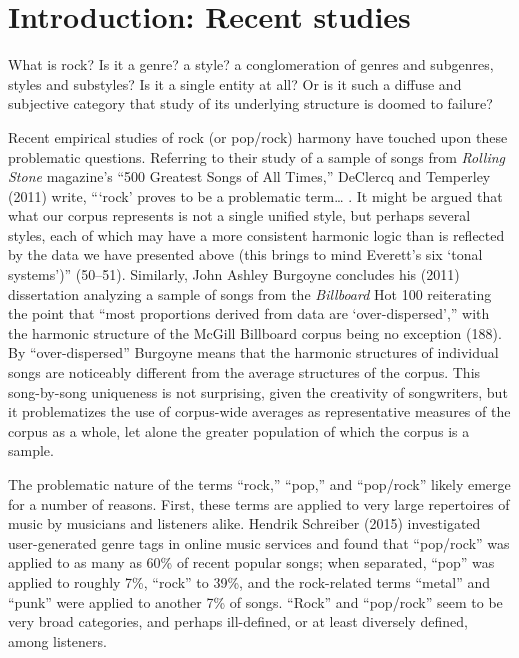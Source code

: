 
\def\mytitle{A cluster analysis of harmony in the McGill Billboard data set}
\def\subtitle{}
\def\myauthor{Kris P. Shaffer, et al.}
\def\latexmode{memoir}


\chapter{Introduction: Recent studies}
\label{introduction:recentstudies}

What is rock? Is it a genre? a style? a conglomeration of genres and subgenres, styles and substyles? Is it a single entity at all? Or is it such a diffuse and subjective category that study of its underlying structure is doomed to failure?

Recent empirical studies of rock (or pop\slash rock) harmony have touched upon these problematic questions. Referring to their study of a sample of songs from \emph{Rolling Stone} magazine's ``500 Greatest Songs of All Times,'' DeClercq and Temperley (2011) write, ```rock' proves to be a problematic term{\ldots} . It might be argued that what our corpus represents is not a single unified style, but perhaps several styles, each of which may have a more consistent harmonic logic than is reflected by the data we have presented above (this brings to mind Everett's six `tonal systems')'' (50–51). Similarly, John Ashley Burgoyne concludes his (2011) dissertation analyzing a sample of songs from the \emph{Billboard} Hot 100 reiterating the point that ``most proportions derived from data are `over-dispersed','' with the harmonic structure of the McGill Billboard corpus being no exception (188). By ``over-dispersed'' Burgoyne means that the harmonic structures of individual songs are noticeably different from the average structures of the corpus. This song-by-song uniqueness is not surprising, given the creativity of songwriters, but it problematizes the use of corpus-wide averages as representative measures of the corpus as a whole, let alone the greater population of which the corpus is a sample.

The problematic nature of the terms ``rock,'' ``pop,'' and ``pop\slash rock'' likely emerge for a number of reasons. First, these terms are applied to very large repertoires of music by musicians and listeners alike. Hendrik Schreiber (2015) investigated user-generated genre tags in online music services and found that ``pop\slash rock'' was applied to as many as 60\% of recent popular songs; when separated, ``pop'' was applied to roughly 7\%, ``rock'' to 39\%, and the rock-related terms ``metal'' and ``punk'' were applied to another 7\% of songs. ``Rock'' and ``pop\slash rock'' seem to be very broad categories, and perhaps ill-defined, or at least diversely defined, among listeners.

